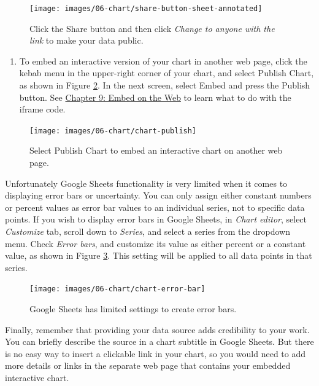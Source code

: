 \documentclass[
  english,
]{book}
\providecommand{\tightlist}{%
  \setlength{\itemsep}{0pt}\setlength{\parskip}{0pt}}
\begin{document}
\begin{figure}
\texttt{[image: images/06-chart/share-button-sheet-annotated]} \caption{Click the Share button and then click \emph{Change to anyone with the link} to make your data public.}\label{fig:share-button-sheet}
\end{figure}

\begin{enumerate}
\def\labelenumi{\arabic{enumi}.}
\setcounter{enumi}{7}
\tightlist
\item
  To embed an interactive version of your chart in another web page, click the kebab menu in the upper-right corner of your chart, and select Publish Chart, as shown in Figure \ref{fig:chart-publish}. In the next screen, select Embed and press the Publish button. See \href{embed.html}{Chapter 9: Embed on the Web} to learn what to do with the iframe code.
\end{enumerate}



\begin{figure}
\texttt{[image: images/06-chart/chart-publish]} \caption{Select Publish Chart to embed an interactive chart on another web page.}\label{fig:chart-publish}
\end{figure}

Unfortunately Google Sheets functionality is very limited when it comes to displaying error bars or uncertainty.
You can only assign either constant numbers or percent values as error bar values to an individual series, not to specific data points. If you wish to display error bars in Google Sheets, in \emph{Chart editor}, select \emph{Customize} tab, scroll down to \emph{Series}, and select a series from the dropdown menu. Check \emph{Error bars}, and customize its value as either percent or a constant value, as shown in Figure \ref{fig:chart-error-bar}. This setting will be applied to all data points in that series.



\begin{figure}
\texttt{[image: images/06-chart/chart-error-bar]} \caption{Google Sheets has limited settings to create error bars.}\label{fig:chart-error-bar}
\end{figure}

Finally, remember that providing your data source adds credibility to your work. You can briefly describe the source in a chart subtitle in Google Sheets. But there is no easy way to insert a clickable link in your chart, so you would need to add more details or links in the separate web page that contains your embedded interactive chart.
\end{document}
